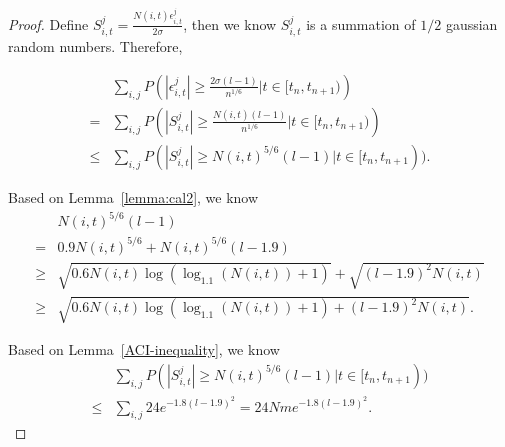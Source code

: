 \documentclass{article}
\begin{document}
\begin{proof}
Define $S_{i,t}^{j}=\frac{N(i,t)\epsilon_{i,t}^{j}}{2\sigma}$, then we know $S_{i,t}^{j}$ is a summation of $1/2$ gaussian random numbers. Therefore,

\begin{align}
&\sum_{i,j}P\left(|\epsilon_{i,t}^{j}|\geq \frac{2\sigma(l-1)}{n^{1/6}}\bigg|t\in[t_n,t_{n+1})\right) \nonumber \\ 
=&\sum_{i,j}P\left(|S_{i,t}^{j}|\geq \frac{N(i,t)(l-1)}{n^{1/6}}\bigg|t\in[t_n,t_{n+1})\right) \nonumber \\
\leq &\sum_{i,j}P(|S_{i,t}^{j}|\geq N(i,t)^{5/6}(l-1)|t\in[t_n,t_{n+1})). \nonumber
\end{align}

Based on Lemma~\ref{lemma:cal2}, we know
\begin{align}
&N(i,t)^{5/6}(l-1) \nonumber \\
=& 0.9N(i,t)^{5/6} + N(i,t)^{5/6}(l-1.9) \nonumber \\
\geq & \sqrt{0.6N(i,t)\log(\log_{1.1}(N(i,t))+1)} + \sqrt{(l-1.9)^2 N(i,t)} \nonumber \\
\geq & \sqrt{0.6N(i,t)\log(\log_{1.1}(N(i,t))+1)+(l-1.9)^2 N(i,t)}. \nonumber
\end{align}

Based on Lemma~\ref{ACI-inequality}, we know
\begin{align}
&\sum_{i,j}P(|S_{i,t}^{j}|\geq N(i,t)^{5/6}(l-1)|t\in[t_n,t_{n+1})) \nonumber \\
\leq & \sum_{i,j}24e^{-1.8(l-1.9)^2} = 24Nme^{-1.8(l-1.9)^2}. \nonumber
\end{align}


\end{proof}
\end{document}
